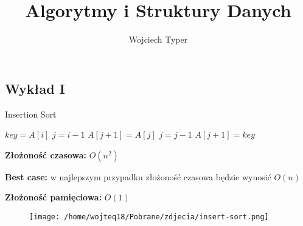 \documentclass{article}
\title{Algorytmy i Struktury Danych}
\author{Wojciech Typer}
\date{}
\begin{document}
\maketitle

\begin{center}
    \section*{Wykład I}
\end{center}

\begin{algorithm}[H]
\caption{Insertion Sort}\label{alg:insertion_sort}
\begin{algorithmic}[1]
        \State $key = A[i]$
        \State $j = i - 1$
            \State $A[j+1] = A[j]$
            \State $j = j - 1$
        \EndWhile
        \State $A[j+1] = key$
    \EndFor
\EndProcedure
\end{algorithmic}
\end{algorithm} 
\vspace{1\baselineskip}
\textbf{Złożoność czasowa:} $O(n^2)$ \par
\textbf{Best case:} w najlepszym przypadku złożoność czasowa będzie wynosić $O(n)$ \par
\textbf{Złożoność pamięciowa:} $O(1)$
\vspace{2\baselineskip}
\begin{figure}[H]
    \centering
    \texttt{[image: /home/wojteq18/Pobrane/zdjecia/insert-sort.png]}
    \label{fig:example_image}
\end{figure}
\vspace{3\baselineskip}
\end{document}
